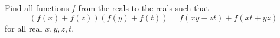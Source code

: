 Find all functions $f$ from the reals to the reals such that
\[ (f(x) + f(z))(f(y) + f(t)) = f(xy - zt) + f(xt + yz) \]
for all real $x, y, z, t$.
